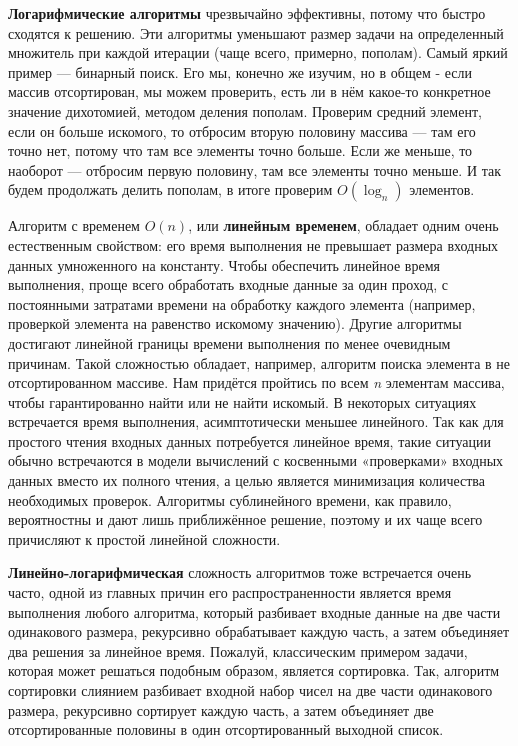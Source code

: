 \documentclass[fontsize=14bp]{report}
\begin{document}
\textbf{Логарифмические алгоритмы} чрезвычайно эффективны, потому что быстро сходятся к решению. Эти алгоритмы уменьшают размер задачи на определенный множитель при каждой итерации (чаще всего, примерно, пополам). Самый яркий пример — бинарный поиск. Его мы, конечно же изучим, но в общем - если массив отсортирован, мы можем проверить, есть ли в нём какое-то конкретное значение дихотомией, методом деления пополам. Проверим средний элемент, если он больше искомого, то отбросим вторую половину массива — там его точно нет, потому что там все элементы точно больше. Если же меньше, то наоборот — отбросим первую половину, там все элементы точно меньше. И так будем продолжать делить пополам, в итоге проверим $O(\log_n)$ элементов.

Алгоритм с временем $O(n)$, или \textbf{линейным временем}, обладает одним очень естественным свойством: его время выполнения не превышает размера входных данных умноженного на константу. Чтобы обеспечить линейное время выполнения, проще всего обработать входные данные за один проход, с постоянными затратами времени на обработку каждого элемента (например, проверкой элемента на равенство искомому значению). Другие алгоритмы достигают линейной границы времени выполнения по менее очевидным причинам. Такой сложностью обладает, например, алгоритм поиска элемента в не отсортированном массиве. Нам придётся пройтись по всем \textit{n} элементам массива, чтобы гарантированно найти или не найти искомый. В некоторых ситуациях встречается время выполнения, асимптотически меньшее линейного. Так как для простого чтения входных данных потребуется линейное время, такие ситуации обычно встречаются в модели вычислений с косвенными «проверками» входных данных вместо их полного чтения, а целью является минимизация количества необходимых проверок. Алгоритмы сублинейного времени, как правило, вероятностны и дают лишь приближённое решение, поэтому и их чаще всего причисляют к простой линейной сложности.

\textbf{Линейно-логарифмическая} сложность алгоритмов тоже встречается очень часто, одной из главных причин его распространенности является время выполнения любого алгоритма, который разбивает входные данные на две части одинакового размера, рекурсивно обрабатывает каждую часть, а затем объединяет два решения за линейное время. Пожалуй, классическим примером задачи, которая может решаться подобным образом, является сортировка. Так, алгоритм сортировки слиянием разбивает входной набор чисел на две части одинакового размера, рекурсивно сортирует каждую часть, а затем объединяет две отсортированные половины в один отсортированный выходной список.
\end{document}

